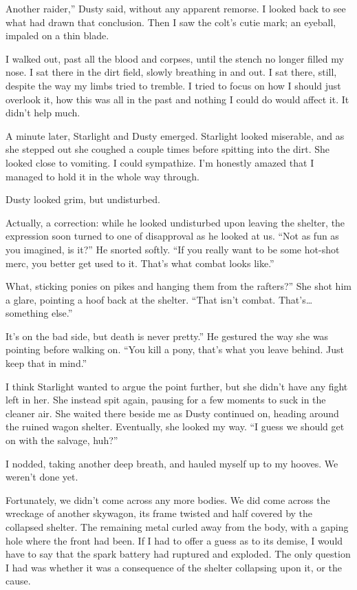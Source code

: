 \leavevmode{}Another raider,” Dusty said, without any apparent remorse. I looked back to see what had drawn that conclusion. Then I saw the colt’s cutie mark; an eyeball, impaled on a thin blade.

I walked out, past all the blood and corpses, until the stench no longer filled my nose. I sat there in the dirt field, slowly breathing in and out. I sat there, still, despite the way my limbs tried to tremble. I tried to focus on how I should just overlook it, how this was all in the past and nothing I could do would affect it. It didn’t help much.

A minute later, Starlight and Dusty emerged. Starlight looked miserable, and as she stepped out she coughed a couple times before spitting into the dirt. She looked close to vomiting. I could sympathize. I’m honestly amazed that I managed to hold it in the whole way through.

Dusty looked grim, but undisturbed.

Actually, a correction: while he looked undisturbed upon leaving the shelter, the expression soon turned to one of disapproval as he looked at us. “Not as fun as you imagined, is it?” He snorted softly. “If you really want to be some hot-shot merc, you better get used to it. That’s what combat looks like.”

\leavevmode{}What, sticking ponies on pikes and hanging them from the rafters?” She shot him a glare, pointing a hoof back at the shelter. “That isn’t combat. That’s… something else.”

\leavevmode{}It’s on the bad side, but death is never pretty.” He gestured the way she was pointing before walking on. “You kill a pony, that’s what you leave behind. Just keep that in mind.”

I think Starlight wanted to argue the point further, but she didn’t have any fight left in her. She instead spit again, pausing for a few moments to suck in the cleaner air. She waited there beside me as Dusty continued on, heading around the ruined wagon shelter. Eventually, she looked my way. “I guess we should get on with the salvage, huh?”

I nodded, taking another deep breath, and hauled myself up to my hooves. We weren’t done yet.

Fortunately, we didn’t come across any more bodies. We did come across the wreckage of another skywagon, its frame twisted and half covered by the collapsed shelter. The remaining metal curled away from the body, with a gaping hole where the front had been. If I had to offer a guess as to its demise, I would have to say that the spark battery had ruptured and exploded. The only question I had was whether it was a consequence of the shelter collapsing upon it, or the cause.

